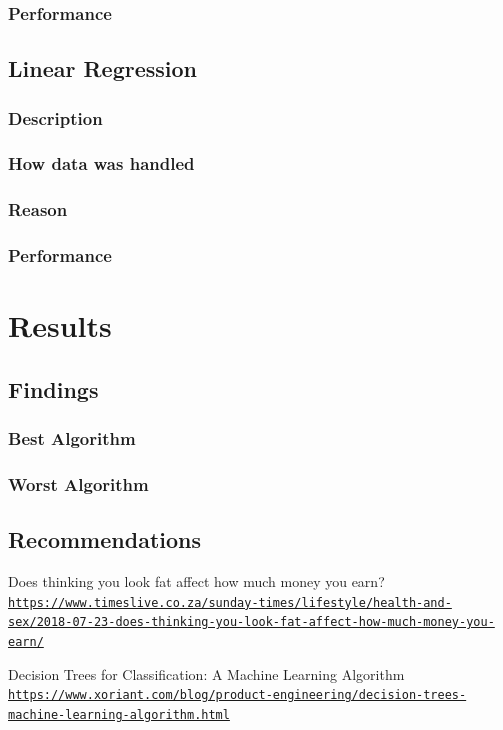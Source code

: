 \documentclass[12pt]{article}
\begin{document}
	\subsubsection{Performance}
	\newpage
	\subsection{Linear Regression}
	\subsubsection{Description}
	\subsubsection{How data was handled}
	\subsubsection{Reason}
	\subsubsection{Performance}
	\newpage
	\section{Results}
	\subsection{Findings}
	\subsubsection{Best Algorithm}
	\subsubsection{Worst Algorithm}
	\subsection{Recommendations}
	\newpage
	
	\begin{thebibliography}{9}
		Does thinking you look fat affect how much money you earn?
		\\\texttt{\url{https://www.timeslive.co.za/sunday-times/lifestyle/health-and-sex/2018-07-23-does-thinking-you-look-fat-affect-how-much-money-you-earn/}}
		
		Decision Trees for Classification: A Machine Learning Algorithm
		\\\texttt{\url{https://www.xoriant.com/blog/product-engineering/decision-trees-machine-learning-algorithm.html}}
	\end{thebibliography}
	
\end{document}
